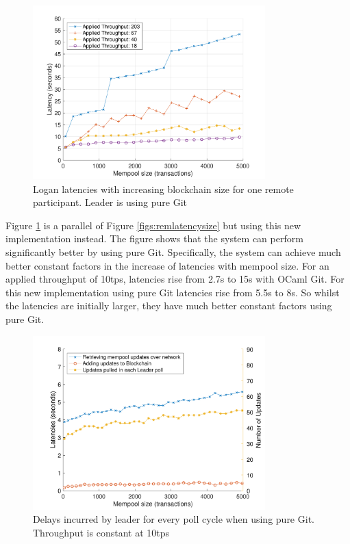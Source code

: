 \documentclass[12pt,a4paper,twoside,openright]{report}
\begin{document}
	\begin{figure} 
		\centering
		\includegraphics[width=0.8\textwidth]{figs/latency_sizes_throughputs.pdf}
		\caption{Logan latencies with increasing blockchain size for one remote participant. Leader is using pure Git}
		\label{figs:latenciespuregit}
	\end{figure}
	Figure \ref{figs:latenciespuregit} is a parallel of Figure \ref{figs:remlatencysize} but using this new implementation instead. 
	The figure shows that the system can perform significantly better by using pure Git. 
	Specifically, the system can achieve much better constant factors in the increase of latencies with mempool size.
	For an applied throughput of 10tps, latencies rise from 2.7s to 15s with OCaml Git. 
	For this new implementation using pure Git latencies rise from 5.5s to 8s. 
	So whilst the latencies are initially larger, they have much better constant factors using pure Git.
	\begin{figure}
		\centering
		\includegraphics[width=0.8\textwidth]{figs/bottlenecks.pdf}
		\caption{Delays incurred by leader for every poll cycle when using pure Git. Throughput is constant at 10tps}
		\label{figs:bottleneckspuregit}
	\end{figure}
\end{document}
